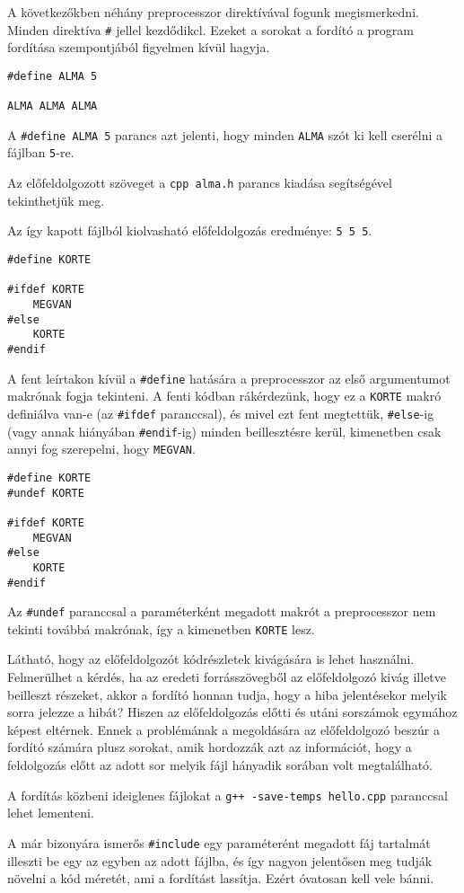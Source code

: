 \documentclass[a4paper,11.5pt,table]{article}
\begin{document}
	A következőkben néhány preprocesszor direktívával fogunk megismerkedni. Minden direktíva \texttt{\#} jellel kezdődikcl. Ezeket a sorokat a fordító a program fordítása szempontjából figyelmen kívül hagyja.
  \bigskip
	
	\begin{lstlisting}
#define ALMA 5

ALMA ALMA ALMA
	\end{lstlisting}
	A \texttt{\#define ALMA 5}  parancs azt jelenti, hogy minden \texttt{ALMA} szót ki kell cserélni a fájlban \texttt{5}-re.
	
	Az előfeldolgozott szöveget a \texttt{cpp alma.h} parancs kiadása segítségével tekinthetjük meg.
	
	Az így kapott fájlból kiolvasható előfeldolgozás eredménye: \texttt{5 5 5}.
	\bigskip
	
	\begin{lstlisting}
#define KORTE

#ifdef KORTE
	MEGVAN
#else
	KORTE
#endif
	\end{lstlisting}
	A fent leírtakon kívül a \texttt{\#define} hatására a preprocesszor az első argumentumot makrónak fogja tekinteni. A fenti kódban rákérdezünk, hogy ez a \texttt{KORTE} makró definiálva van-e (az \texttt{\#ifdef} paranccsal), és mivel ezt fent megtettük, \texttt{\#else}-ig (vagy annak hiányában \texttt{\#endif}-ig) minden beillesztésre kerül, kimenetben csak annyi fog szerepelni, hogy \texttt{MEGVAN}.
	\bigskip
	
	\begin{lstlisting}
#define KORTE
#undef KORTE

#ifdef KORTE
	MEGVAN
#else
	KORTE
#endif
	\end{lstlisting}
	Az \texttt{\#undef} paranccsal a paraméterként megadott makrót a preprocesszor nem tekinti továbbá makrónak, így a kimenetben \texttt{KORTE} lesz.
	
	Látható, hogy az előfeldolgozót kódrészletek kivágására is lehet használni. 
  Felmerülhet a kérdés, ha az eredeti forrásszövegből az előfeldolgozó kivág illetve beilleszt részeket, akkor a fordító honnan tudja, hogy a hiba jelentésekor melyik sorra jelezze a hibát? Hiszen az előfeldolgozás előtti és utáni sorszámok egymához képest eltérnek. Ennek a problémának a megoldására az előfeldolgozó beszúr a fordító számára plusz sorokat, amik hordozzák azt az információt, hogy a feldolgozás előtt az adott sor melyik fájl hányadik sorában volt megtalálható. 
	\begin{note}
		 A fordítás közbeni ideiglenes fájlokat a \texttt{g++ -save-temps hello.cpp} paranccsal lehet lementeni.
	\end{note}
	A már bizonyára ismerős \texttt{\#include} egy paraméterént megadott fáj tartalmát illeszti be egy az egyben az adott fájlba, és így nagyon jelentősen meg tudják növelni a kód méretét, ami a fordítást lassítja. Ezért óvatosan kell vele bánni.
	\bigskip
	
\end{document}
